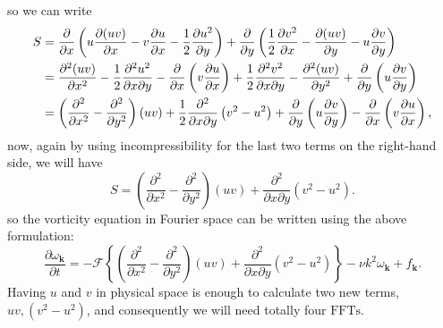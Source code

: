 \documentclass[12pt]{article}
\def\vk{\bm{k}}
\begin{document}
so we can write
\begin{align}\label{Eq-19}
S &= \dfrac{\partial}{\partial x} \left(u\dfrac{\partial (uv)}{\partial x}-v\dfrac{\partial u}{\partial x}-\dfrac{1}{2}\dfrac{\partial u^2}{\partial y}\right)+\dfrac{\partial}{\partial y} \left(\dfrac{1}{2}\dfrac{\partial v^2}{\partial x}- \dfrac{\partial (uv)}{\partial y}-u\dfrac{\partial v}{\partial y}\right) 							  		\notag \\
&= \dfrac{\partial^2 (uv)}{\partial x^2}-\dfrac{1}{2}\dfrac{\partial^2 u^2}{\partial x \partial y}-\dfrac{\partial }{\partial x}\left(v\dfrac{\partial u}{\partial x}\right)+\dfrac{1}{2}\dfrac{\partial^2 v^2}{\partial x \partial y}-\dfrac{\partial^2 (uv)}{\partial y^2}+\dfrac{\partial }{\partial y}\left(u\dfrac{\partial v}{\partial y}\right) 		\notag \\
&= \left(\dfrac{\partial^2}{\partial x^2}-\dfrac{\partial^2}{\partial y^2}\right)(uv)+\dfrac{1}{2}\dfrac{\partial^2}{\partial x \partial y}\left(v^2 - u^2 \right)+\dfrac{\partial }{\partial y}\left(u\dfrac{\partial v}{\partial y}\right)-\dfrac{\partial }{\partial x}\left(v\dfrac{\partial u}{\partial x}\right),
\end{align}
now, again by using incompressibility for the last two terms on the right-hand side, we will have
\begin{equation}\label{Eq-20}
S =\left(\dfrac{\partial^2}{\partial x^2}-\dfrac{\partial^2}{\partial y^2}\right)(uv)+\dfrac{\partial^2}{\partial x \partial y}\left(v^2 - u^2 \right).
\end{equation}
so the vorticity equation in Fourier space can be written using the above formulation:
\begin{equation}\label{Eq-21}
\frac{\partial\omega_{\vk}}{\partial t} =- \mathcal{F}\left\lbrace\left(\dfrac{\partial^2}{\partial x^2}-\dfrac{\partial^2}{\partial y^2}\right)(uv)+\dfrac{\partial^2}{\partial x \partial y}\left(v^2 - u^2 \right)\right\rbrace-\nu k^2\omega_{\vk} + f_{\vk}.
\end{equation}
Having $u$ and $v$ in physical space is enough to calculate two new terms, $uv, (v^2 - u^2)$, and consequently we will need totally four $\text{FFTs}$.

\clearpage
{}
{}


\clearpage
{}
{}
\printindex
\end{document}
